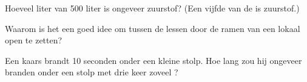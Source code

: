 \begin{exercise}[$\star$]\label{exo:g4:air-a-mixture-of-gases:9}
Hoeveel liter van 500 liter  is ongeveer zuurstof? (Een vijfde van
de  is zuurstof.)
\end{exercise}

\begin{exercise}[$\star\star$]\label{exo:g4:air-a-mixture-of-gases:10}
Waarom is het een goed idee om tussen de lessen door de ramen van een
lokaal open te zetten?
\end{exercise}

\begin{exercise}[$\star\star$]\label{exo:g4:air-a-mixture-of-gases:11}
Een kaars brandt 10 seconden onder een kleine stolp. Hoe lang zou hij
ongeveer branden onder een stolp met drie keer zoveel ?
\end{exercise}
